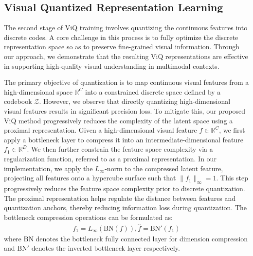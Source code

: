 \subsection{Visual Quantized Representation Learning}
\label{sec:methods_2}

The second stage of ViQ training involves quantizing the continuous features into discrete codes. A core challenge in this process is to fully optimize the discrete representation space so as to preserve fine-grained visual information. Through our approach, we demonstrate that the resulting ViQ representations are effective in supporting high-quality visual understanding in multimodal contexts.

The primary objective of quantization is to map continuous visual features from a high-dimensional space $\mathbb{R}^{C}$ into a constrained discrete space defined by a codebook $\mathcal{Z}$. However, we observe that directly quantizing high-dimensional visual features results in significant precision loss. To mitigate this, our proposed ViQ method progressively reduces the complexity of the latent space using a proximal representation. Given a high-dimensional visual feature $f \in \mathbb{R}^C$, we first apply a bottleneck layer to compress it into an intermediate-dimensional feature $f_1 \in \mathbb{R}^D$. We then further constrain the feature space complexity via a regularization function, referred to as a proximal representation. In our implementation, we apply the $L_\infty$-norm to the compressed latent feature, projecting all features onto a hypercube surface such that $\lVert f_1 \rVert_\infty = 1$. This step progressively reduces the feature space complexity prior to discrete quantization. The proximal representation helps regulate the distance between features and quantization anchors, thereby reducing information loss during quantization. The bottleneck compression operations can be formulated as:
\begin{equation}
\begin{aligned}
    f_1=L_{\infty}(\text{BN}(f)), \hat{f}=\text{BN}'(f_1)
\end{aligned}
\end{equation}
where $\text{BN}$ denotes the bottleneck fully connected layer for dimension compression and $\text{BN}'$ denotes the inverted bottleneck layer respectively.

